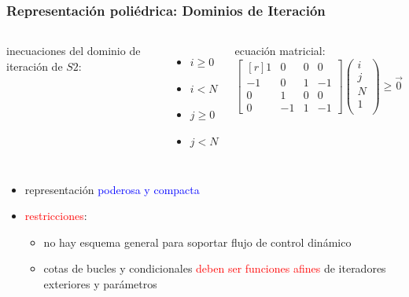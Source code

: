 \documentclass{beamer}\usetheme{Madrid} %
\begin{document}
\begin{frame}
\frametitle{Representación poliédrica: Dominios de Iteración}
\begin{columns}
inecuaciones del dominio de iteración de $S2$: 
\begin{itemize}
\item $ i \geq 0 $
\item $ i  < N $
\item $ j \geq 0 $
\item $ j < N $
\end{itemize}
ecuación matricial: 
$$
\begin{bmatrix*}[r] 1 &  0 & 0 &  0 \\ 
                               -1 &  0 & 1 & -1 \\ 
                                0 &  1 & 0 &  0 \\
                                0 & -1 & 1 & -1 \end{bmatrix*} 
            \left( \begin{array}{c} i \\ j \\ N\\ 1\\ \end{array} \right)
            \geq \vec{0}
$$
\end{columns}
\begin{itemize}
\item representación \textcolor{blue}{poderosa y compacta} 
\item \textcolor{red}{restricciones}:
\begin{itemize}
\item no hay esquema general para soportar flujo de control dinámico
\item cotas de bucles y condicionales \textcolor{red}{deben ser funciones afines}
de iteradores exteriores y parámetros
\end{itemize}
\end{itemize} 
\end{frame}
\end{document}
